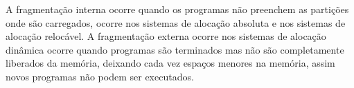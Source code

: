 
A fragmentação interna ocorre quando os programas não preenchem as partições
onde são carregados, ocorre nos sistemas de alocação absoluta e nos sistemas
de alocação relocável.
A fragmentação externa ocorre nos sistemas de alocação dinâmica ocorre quando
programas são terminados mas não são completamente liberados da memória, deixando
cada vez espaços menores na memória, assim novos programas não podem ser executados.\\
